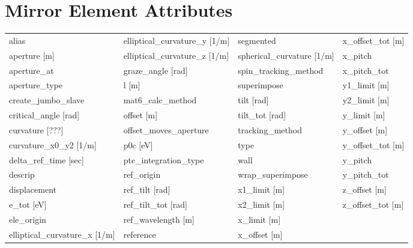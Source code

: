  \vfill
 
 \section{Mirror Element Attributes}
 \label{s:list.mirror}
 
 \begin{tabular}{llll} \toprule
alias                            & elliptical_curvature_y [1/m]     & segmented                        & x_offset_tot [m]                 \\
aperture [m]                     & elliptical_curvature_z [1/m]     & spherical_curvature [1/m]        & x_pitch                          \\
aperture_at                      & graze_angle [rad]                & spin_tracking_method             & x_pitch_tot                      \\
aperture_type                    & l [m]                            & superimpose                      & y1_limit [m]                     \\
create_jumbo_slave               & mat6_calc_method                 & tilt [rad]                       & y2_limit [m]                     \\
critical_angle [rad]             & offset [m]                       & tilt_tot [rad]                   & y_limit [m]                      \\
curvature [???]                  & offset_moves_aperture            & tracking_method                  & y_offset [m]                     \\
curvature_x0_y2 [1/m]            & p0c [eV]                         & type                             & y_offset_tot [m]                 \\
delta_ref_time [sec]             & ptc_integration_type             & wall                             & y_pitch                          \\
descrip                          & ref_origin                       & wrap_superimpose                 & y_pitch_tot                      \\
displacement                     & ref_tilt [rad]                   & x1_limit [m]                     & z_offset [m]                     \\
e_tot [eV]                       & ref_tilt_tot [rad]               & x2_limit [m]                     & z_offset_tot [m]                 \\
ele_origin                       & ref_wavelength [m]               & x_limit [m]                      &                                  \\
elliptical_curvature_x [1/m]     & reference                        & x_offset [m]                     &                                  \\
 \bottomrule
 \end{tabular}
 \vfill
 
